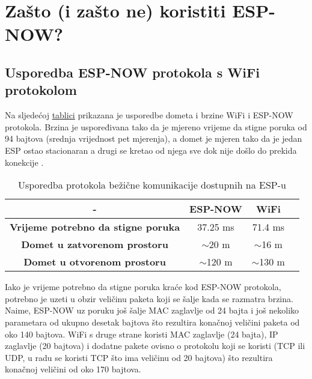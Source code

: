 \documentclass[seminarskirad]{fer}
\begin{document}
\section{Zašto (i zašto ne) koristiti ESP-NOW?}

\subsection{Usporedba ESP-NOW protokola s WiFi protokolom}

Na sljedećoj \hyperref[tab:tablica]{tablici} prikazana je usporedbe dometa i brzine WiFi i ESP-NOW protokola. Brzina je uspoređivana tako da je mjereno vrijeme da stigne poruka od 94 bajtova (srednja vrijednost pet mjerenja), a domet je mjeren tako da je jedan ESP ostao stacionaran a drugi se kretao od njega sve dok nije došlo do prekida konekcije\footnotemark{} .

\begin{table}[h!]
    \centering
    \begin{tabular}{|c|c|c|c|} 
     \hline
     - & \textbf{ESP-NOW} & \textbf{WiFi} \\
     \hline
     \textbf{Vrijeme potrebno da stigne poruka} & 37.25 ms & 71.4 ms\\ 
     \hline
     \textbf{Domet u zatvorenom prostoru} & $\sim$20 m &  $\sim$16 m\\
     \hline
     \textbf{Domet u otvorenom prostoru} & $\sim$120 m & $\sim$130 m\\
     \hline
    \end{tabular}
    \caption{Usporedba protokola bežične komunikacije dostupnih na ESP-u}
    \label{tab:tablica}
\end{table}

Iako je vrijeme potrebno da stigne poruka kraće kod ESP-NOW protokola, potrebno je uzeti u obzir veličinu paketa koji se šalje kada se razmatra brzina. Naime, ESP-NOW uz poruku još šalje MAC zaglavlje od 24 bajta i još nekoliko parametara od ukupno desetak bajtova što rezultira konačnoj veličini paketa od oko 140 bajtova. WiFi s druge strane koristi MAC zaglavlje (24 bajta), IP zaglavlje (20 bajtova) i dodatne pakete ovisno o protokolu koji se koristi (TCP ili UDP, u radu se koristi TCP što ima veličinu od 20 bajtova) što rezultira konačnoj veličini od oko 170 bajtova. 
\end{document}
